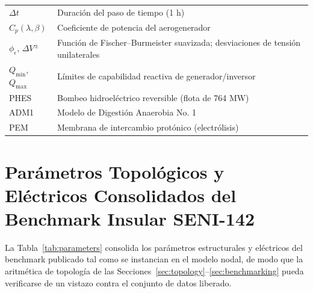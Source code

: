 \begin{table}[!t]
\begin{tabular}{@{}p{} p{}@{}}
$\Delta t$ & Duración del paso de tiempo (1 h) \\
$C_p(\lambda, \beta)$ & Coeficiente de potencia del aerogenerador \\
$\phi_\epsilon$, $\Delta V^{\pm}$ & Función de Fischer--Burmeister suavizada; desviaciones de tensión unilaterales \\
$Q_{\min}$, $Q_{\max}$ & Límites de capabilidad reactiva de generador/inversor \\
PHES & Bombeo hidroeléctrico reversible (flota de 764 MW) \\
ADM1 & Modelo de Digestión Anaerobia No. 1 \\
PEM & Membrana de intercambio protónico (electrólisis) \\
\bottomrule
\end{tabular}
\end{table}

\appendix
\section{Parámetros Topológicos y Eléctricos Consolidados del Benchmark Insular SENI-142}
\label{app:parameters}

La Tabla~\ref{tab:parameters} consolida los parámetros estructurales y eléctricos del benchmark publicado tal como se instancian en el modelo nodal, de modo que la aritmética de topología de las Secciones~\ref{sec:topology}--\ref{sec:benchmarking} pueda verificarse de un vistazo contra el conjunto de datos liberado.

